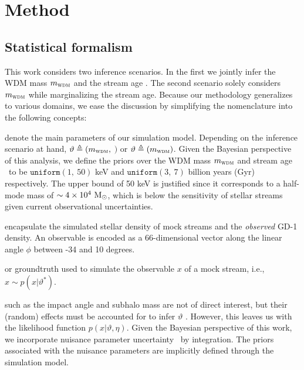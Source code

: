 \documentclass[fleqn,usenatbib]{mnras}
\begin{document}
\section{Method}
\label{sec:method}
\subsection{Statistical formalism}
\label{sec:method_statistical_formalism}
This work considers two inference scenarios.
In the first we jointly infer the WDM mass $m_\textsc{wdm}$ and the stream age \tage.
The second scenario solely considers $m_\textsc{wdm}$ while marginalizing the stream age.
Because our methodology generalizes to various domains,
we ease the discussion by simplifying the nomenclature into the following concepts:

\bigskip

 denote the main parameters of our simulation model.
Depending on the inference scenario at hand, $\vartheta\triangleq(m_\textsc{wdm},~$\tage$)$ or $\vartheta\triangleq(m_\textsc{wdm})$.
Given the Bayesian perspective of this analysis, we define the priors over the WDM mass $m_\textsc{wdm}$ and stream age \tage~to be
$\texttt{uniform}(1,~50)$ keV and $\texttt{uniform}(3,~7)$ billion years (Gyr) respectively.
The upper bound of 50 keV is justified since it corresponds to a half-mode mass of $\sim 4 \times 10^4~\textrm{M}_\odot$, which is below the sensitivity of stellar streams given current observational uncertainties.

\bigskip

 encapsulate the simulated stellar density of mock streams and the \emph{observed} GD-1 density.
An observable is encoded as a 66-dimensional vector along the linear angle $\phi$ between -34 and 10 degrees.

\bigskip

 or groundtruth used to simulate the observable $x$ of a mock stream, i.e., $x\sim p(x\vert\vartheta^*)$.

\bigskip

 such as the impact angle and subhalo mass are not of direct interest, but their (random) effects must
be accounted for to infer $\vartheta$ \citep{incidental}. However, this
leaves us with the likelihood function $p(x\vert\vartheta,\eta)$. Given the Bayesian
perspective of this work, we incorporate nuisance parameter uncertainty~\citep{berger1999integrated} by
integration. The priors associated with the nuisance parameters are
implicitly defined through the simulation model.
\end{document}
